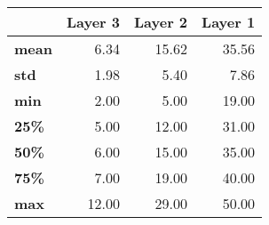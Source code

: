 \begin{tabular}{lrrr}
\toprule
{} &  Layer 3 &  Layer 2 &  Layer 1 \\
\midrule
\textbf{mean} &     6.34 &    15.62 &    35.56 \\
\textbf{std } &     1.98 &     5.40 &     7.86 \\
\textbf{min } &     2.00 &     5.00 &    19.00 \\
\textbf{25\% } &     5.00 &    12.00 &    31.00 \\
\textbf{50\% } &     6.00 &    15.00 &    35.00 \\
\textbf{75\% } &     7.00 &    19.00 &    40.00 \\
\textbf{max } &    12.00 &    29.00 &    50.00 \\
\bottomrule
\end{tabular}
